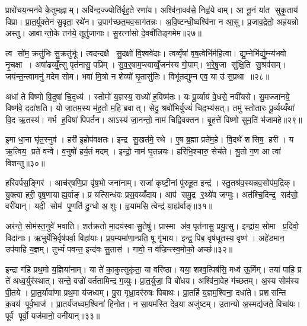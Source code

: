 प्रारो॑चय॒न्मन॑वे के॒तुमह्नाम्। अवि॑न्द॒ज्ज्योति॑र्बृह॒ते रणा॑य। अश्वि॑ना॒वव॑से॒ निह्व॑ये वाम्। आ नू॒नं या॑त सुकृ॒ताय॑ विप्रा। प्रा॒त॒र्यु॒क्तेन॑ सु॒वृता॒ रथे॑न। उ॒पाग॑च्छत॒मव॒साग॑तन्नः। अ॒वि॒ष्टन्धी॒ष्वश्वि॑ना न आ॒सु। प्र॒जाव॒द्रेतो॒ अह्र॑यन्नो अस्तु। आवान्तो॒के तन॑ये॒ तूतु॑जानाः। सु॒रत्ना॑सो दे॒ववी॑तिङ्गमेम॥२७॥

त्व सो॑म॒ क्रतु॑भिः सु॒क्रतु॑र्भूः। त्वदन्दक्षै सु॒दक्षो॑ वि॒श्ववे॑दाः। त्वव्वृँषा॑ वृष॒त्वेभि॑र्महि॒त्वा। द्यु॒म्नेभि॑र्द्यु॒म्न्य॑भवो नृ॒चक्षा। अषा॑ढय्युँ॒त्सु पृत॑नासु॒ पप्रिम्। सु॒व॒र्॒षाम॒प्स्वाव्वृँ॒जन॑स्य गो॒पाम्। भ॒रे॒षु॒जा सु॑क्षि॒ति सु॒श्रव॑सम्। जय॑न्त॒न्त्वामनु॑ मदेम सोम। भवा॑ मि॒त्रो न शेव्यो॑ घृ॒तासु॑तिः। विभू॑तद्युम्न एव॒ या उ॑ स॒प्रथा॥२८॥

अधा॑ ते विष्णो वि॒दुषा॑ चि॒दृध्य॑। स्तोमो॑ य॒ज्ञस्य॒ राध्यो॑ ह॒विष्म॑तः। यः पू॒र्व्याय॑ वे॒धसे॒ नवी॑यसे। सु॒मज्जा॑नये॒ विष्ण॑वे॒ ददा॑शति। यो जा॒तम॒स्य म॑ह॒तो म॒हि ब्रवात्। सेदु॒ श्रवो॑भिर्यु॒ज्यं॑         चिद॒भ्य॑सत्। तमु॑ स्तोतारः पू॒र्व्यय्यँथा॑ वि॒द ऋ॒तस्य॑। गर्भ ह॒विषा॑ पिपर्तन। आऽस्य॑ जा॒नन्तो॒ नाम॑ चिद्विवक्तन। बृ॒हत्ते॑ विष्णो सुम॒तिं भ॑जामहे॥२९॥

इ॒मा धा॒ना घृ॑त॒स्नुव॑। हरी॑ इ॒होप॑वक्षतः। इन्द्र सु॒खत॑मे॒ रथे। ए॒ष ब्र॒ह्मा प्रते॑म॒हे। वि॒दथे॑ शसिष॒ हरी। य ऋ॒त्विय॒ प्रते॑ वन्वे। व॒नुषो॑ हर्य॒तं मदम्। इन्द्रो॒ नाम॑ घृ॒तन्नयः। हरि॑भि॒श्चारु॒ सेच॑ते। श्रु॒तो ग॒ण आ त्वा॑ विशन्तु॥३०॥

हरि॑वर्पस॒ङ्गिर॑। आच॑र्‌षणि॒प्रा वृ॑ष॒भो जना॑नाम्। राजा॑ कृष्टी॒नां पु॑रुहू॒त इन्द्र॑। स्तु॒तश्र॑व॒स्यन्नव॒सोप॑म॒द्रिक्। यु॒क्त्वा हरी॒ वृष॒णायाह्य॒र्वाङ्। प्र यत्सिन्ध॑वः प्रस॒वय्यँदाय\sn{}। आप॑ समु॒द्र र॒थ्ये॑व जग्मुः। अत॑श्चि॒दिन्द्र॒ सद॑सो॒ वरी॑यान्। यदी॒ सोम॑ पृ॒णति॑ दु॒ग्धो अ॒शुः। ह्वया॑मसि॒ त्वेन्द्र॑ या॒ह्य॑र्वाङ्॥३१॥

अर॑न्ते॒ सोम॑स्त॒नुवे॑ भवाति। शत॑क्रतो मा॒दय॑स्वा सु॒तेषु॑। प्रास्मा अ॑व॒ पृत॑नासु॒ प्रयु॒त्सु। इन्द्रा॑य॒ सोमा प्र॒दिवो॒ विदा॑नाः। ऋ॒भुर्येभि॒र्वृष॑पर्वा॒ विहा॑याः। प्र॒य॒म्यमा॑णा॒न्प्रति॒ षू गृ॑भाय। इन्द्र॒ पिब॒ वृष॑धूतस्य॒ वृष्ण॑। अहे॑डमान॒ उप॑याहि य॒ज्ञम्। तुभ्यं॑ पवन्त॒ इन्द॑वः सु॒तास॑। गावो॒ न व॑ज्रिन्त्स्व॒मोको॒ अच्छ॑॥३२॥

इन्द्रा ग॑हि प्रथ॒मो य॒ज्ञिया॑नाम्। या ते॑ का॒कुत्सुकृ॑ता॒ या वरि॑ष्ठा। यया॒ शश्व॒त्पिब॑सि॒ मध्व॑ ऊ॒र्मिम्। तया॑ पाहि॒ प्र ते॑ अध्व॒र्युर॑स्थात्। सन्ते॒ वज्रो॑ वर्ततामिन्द्र ग॒व्युः। प्रा॒त॒र्युजा॒ वि बो॑धय। अश्वि॑ना॒वेह ग॑च्छतम्। अ॒स्य सोम॑स्य पी॒तये। प्रा॒त॒र्यावा॑णा प्रथ॒मा य॑जध्वम्। पु॒रा गृध्रा॒दर॑रुषः पिबाथः। प्रा॒तर्\mbox{}हि य॒ज्ञम॒श्विना॒ दधा॑ते। प्रशसन्ति क॒वय॑ पूर्व॒भाज॑। प्रा॒तर्य॑जध्वम॒श्विना॑ हिनोत। न सा॒यम॑स्ति देव॒या अजु॑ष्टम्। उ॒तान्यो अ॒स्मद्य॑जते॒ विचा॑यः। पूर्व॑ पूर्वो॒ यज॑मानो॒ वनी॑यान्॥३३॥\anuvakamend[चा॒श्व॒जिद्यो ग॑च्छतन्नो॒ दाश॒न्नामा॑भि॒श्रीर्ग॑मेम स॒प्रथा॑ भजामहे विशन्तु या॒ह्य॑र्वाङच्छ॑ पिबाथ॒ष्षट्च॑]

